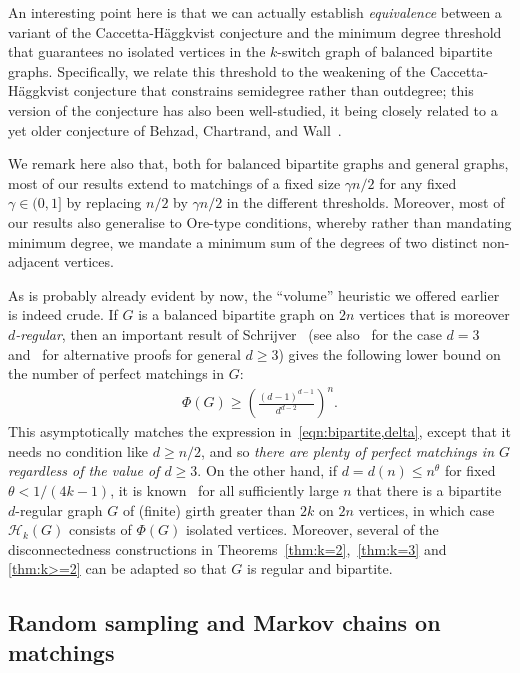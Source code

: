 \documentclass[11pt,a4paper]{article}
\theoremstyle{definition}
\begin{document}
An interesting point here is that we can actually establish {\em equivalence} between a variant of the Caccetta-Häggkvist conjecture and the minimum degree threshold that guarantees no isolated vertices in the $k$-switch graph of balanced bipartite graphs.
Specifically, we relate this threshold to the weakening of the Caccetta-Häggkvist conjecture that constrains semidegree rather than outdegree; this version of the conjecture has also been well-studied, it being closely related to a yet older conjecture of Behzad, Chartrand, and Wall~\cite{BCW70}.


We remark here also that, both for balanced bipartite graphs and general graphs, most of
our results extend to matchings of a fixed size $\gamma n/2$ for any fixed
$\gamma \in (0,1]$ by replacing $n/2$ by $\gamma n/2$ in the different
thresholds. Moreover, most of our results also generalise to Ore-type conditions, whereby rather than mandating minimum degree, we mandate a minimum sum of the degrees of two distinct non-adjacent vertices. 

As is probably already evident by now, the ``volume'' heuristic we offered earlier is indeed crude.
If $G$ is a balanced bipartite graph on
$2n$ vertices that is moreover {\em $d$-regular}, then an important result of
Schrijver~\cite{Sch98} (see also~\cite{Voo79} for the case $d=3$
and~\cite{Gur08,Csi17} for alternative proofs for general $d\ge3$) gives the
following lower bound on the number of perfect matchings in $G$:
\begin{align*}
  \Phi(G) \ge \left(\frac{(d-1)^{d-1}}{d^{d-2}}\right)^n.
\end{align*}
This asymptotically matches the expression in~\eqref{eqn:bipartite,delta}, 
except that it needs no condition like $d \ge n/2$, and so
{\em there are plenty of perfect matchings in $G$ regardless of the value of
  $d\ge 3$}. 
 On the other hand, if $d = d(n) \le n^{\theta}$ for fixed $\theta < 1/(4k-1)$, it is known~\cite{MWW04} for all sufficiently large $n$ that there is a bipartite $d$-regular graph $G$ of (finite) girth greater than $2k$ on $2n$ vertices, in which case $\mathcal H_k(G)$ consists of $\Phi(G)$ isolated vertices.
 Moreover, several of the disconnectedness constructions in Theorems~\ref{thm:k=2},~\ref{thm:k=3} and \ref{thm:k>=2} can be adapted so that $G$ is regular and bipartite. 
  
\subsection{Random sampling and Markov chains on matchings}\label{ssec:sampling}
\end{document}
